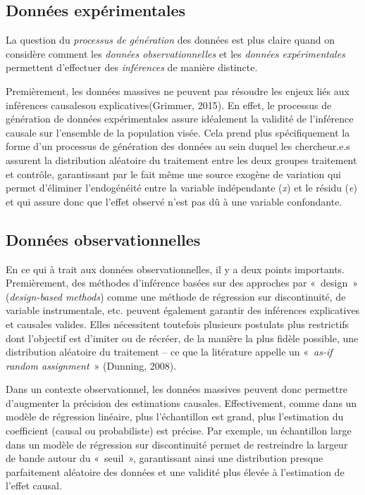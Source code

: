 \documentclass[
  letterpaper,
]{scrbook}
\begin{document}
\hypertarget{donnuxe9es-expuxe9rimentales}{%
\subsection{Données expérimentales}\label{donnuxe9es-expuxe9rimentales}}

La question du \emph{processus de génération} des données est plus
claire quand on considère comment les \emph{données observationnelles}
et les \emph{données expérimentales} permettent d'effectuer des
\emph{inférences} de manière distincte.

Premièrement, les données massives ne peuvent pas résoudre les enjeux
liés aux inférences causalesou explicatives(Grimmer, 2015). En effet, le
processus de génération de données expérimentales assure idéalement la
validité de l'inférence causale sur l'ensemble de la population visée.
Cela prend plus spécifiquement la forme d'un processus de génération des
données au sein duquel les chercheur.e.s assurent la distribution
aléatoire du traitement entre les deux groupes traitement et contrôle,
garantissant par le fait même une source exogène de variation qui permet
d'éliminer l'endogénéité entre la variable indépendante (\emph{x}) et le
résidu (\emph{e}) et qui assure donc que l'effet observé n'est pas dû à
une variable confondante.

\hypertarget{donnuxe9es-observationnelles}{%
\subsection{Données
observationnelles}\label{donnuxe9es-observationnelles}}

En ce qui à trait aux données observationnelles, il y a deux points
importants. Premièrement, des méthodes d'inférence basées sur des
approches par «~design~» (\emph{design-based methods}) comme une méthode
de régression sur discontinuité, de variable instrumentale, etc. peuvent
également garantir des inférences explicatives et causales valides.
Elles nécessitent toutefois plusieurs postulats plus restrictifs dont
l'objectif est d'imiter ou de récréer, de la manière la plus fidèle
possible, une distribution aléatoire du traitement -- ce que la
litérature appelle un «~\emph{as-if random assignment}~» (Dunning,
2008).

Dans un contexte observationnel, les données massives peuvent donc
permettre d'augmenter la précision des estimations causales.
Effectivement, comme dans un modèle de régression linéaire, plus
l'échantillon est grand, plus l'estimation du coefficient (causal ou
probabiliste) est précise. Par exemple, un échantillon large dans un
modèle de régression sur discontinuité permet de restreindre la largeur
de bande autour du «~seuil~», garantissant ainsi une distribution
presque parfaitement aléatoire des données et une validité plus élevée à
l'estimation de l'effet causal.
\end{document}
